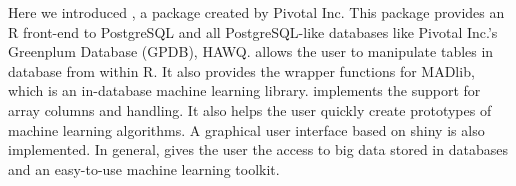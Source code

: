 Here we introduced , a package created by Pivotal
Inc. This package provides an R front-end to PostgreSQL and all
PostgreSQL-like databases like Pivotal Inc.'s Greenplum Database
(GPDB), HAWQ.  allows the user to manipulate tables in
database from within R. It also provides the wrapper functions for
MADlib,
which is an in-database machine learning library. 
implements the support for array columns and  handling. It
also helps the user quickly create prototypes of machine learning
algorithms. A graphical user interface based on shiny is also
implemented. In general,  gives the user the access to
big data stored in databases and an easy-to-use machine learning
toolkit.



\address{Hai Qian\\
  Pivotal Inc.\\
  1900 S. Norvolk St., San Mateo, CA 94403\\
  USA}

